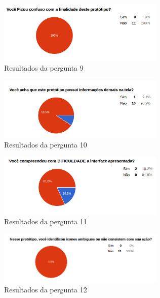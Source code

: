\begin{figure}[!h]
  \centering
  \includegraphics[width=300px, scale=1]{figuras/result9}
  \caption{Resultados da pergunta 9}
\label{fig:result9}
\end{figure}


\begin{figure}[!h]
  \centering
  \includegraphics[width=300px, scale=1]{figuras/result10}
  \caption{Resultados da pergunta 10}
\label{fig:result10}
\end{figure}


\begin{figure}[!h]
  \centering
  \includegraphics[width=300px, scale=1]{figuras/result11}
  \caption{Resultados da pergunta 11}
\label{fig:result11}
\end{figure}


\begin{figure}[!h]
  \centering
  \includegraphics[width=300px, scale=1]{figuras/result12}
  \caption{Resultados da pergunta 12}
\label{fig:result12}
\end{figure}
	 	 	 	
